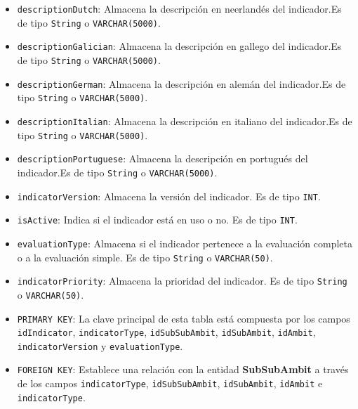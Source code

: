 \begin{itemize}
\begin{itemize}
        \item \texttt{descriptionDutch}: Almacena la descripción en neerlandés del indicador.Es de tipo \texttt{String} o \texttt{VARCHAR(5000)}.
        \item \texttt{descriptionGalician}: Almacena la descripción en gallego del indicador.Es de tipo \texttt{String} o \texttt{VARCHAR(5000)}.
        \item \texttt{descriptionGerman}: Almacena la descripción en alemán del indicador.Es de tipo \texttt{String} o \texttt{VARCHAR(5000)}.
        \item \texttt{descriptionItalian}: Almacena la descripción en italiano del indicador.Es de tipo \texttt{String} o \texttt{VARCHAR(5000)}.
        \item \texttt{descriptionPortuguese}: Almacena la descripción en portugués del indicador.Es de tipo \texttt{String} o \texttt{VARCHAR(5000)}.
        \item \texttt{indicatorVersion}: Almacena la versión del indicador. Es de tipo \texttt{INT}.
        \item \texttt{isActive}: Indica si el indicador está en uso o no. Es de tipo \texttt{INT}.
        \item \texttt{evaluationType}: Almacena si el indicador pertenece a la evaluación completa o a la evaluación simple. Es de tipo \texttt{String} o \texttt{VARCHAR(50)}.
        \item \texttt{indicatorPriority}: Almacena la prioridad del indicador. Es de tipo \texttt{String} o \texttt{VARCHAR(50)}.
        \item \texttt{PRIMARY KEY}: La clave principal de esta tabla está compuesta por los campos \texttt{idIndicator}, \texttt{indicatorType}, \texttt{idSubSubAmbit}, \texttt{idSubAmbit}, \texttt{idAmbit}, \texttt{indicatorVersion} y \texttt{evaluationType}.
        \item \texttt{FOREIGN KEY}: Establece una relación con la entidad \textbf{SubSubAmbit} a través de los campos \texttt{indicatorType}, \texttt{idSubSubAmbit}, \texttt{idSubAmbit}, \texttt{idAmbit} e \texttt{indicatorType}.
        \end{itemize}



\end{itemize}
